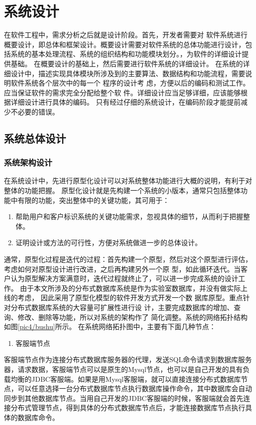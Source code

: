 
\chapter{系统设计}
在软件工程中，需求分析之后就是设计阶段。首先，开发者需要对
软件系统进行概要设计，即总体和框架设计。概要设计需要对软件系统的总体功能进行设计，包括系统的基本处理流程、系统的组织结构和功能模块划分。，为软件的详细设计提供基础。
在概要设计的基础上，然后需要进行软件系统的详细设计。
在系统的详细设计中，描述实现具体模块所涉及到的主要算法、数据结构和功能流程，需要说明软件系统各个层次中的每一个
程序的设计考
虑，方便以后的编码和测试工作。应当保证软件的需求完全分配给整个软
件。详细设计应当足够详细，应该能够根据详细设计进行具体的编码。
只有经过仔细的系统设计，在编码阶段才能提前减少不必要的错误。
\section{系统总体设计}
\subsection{系统架构设计}
在系统设计中，先进行原型化设计可以对系统整体功能进行大概的说明，有利于对整体的功能把握。
原型化设计就是先构建一个系统的小版本，通常只包括整体功能中有限的功能，突出整体中的关键功能，其可用于：
\begin{enumerate}
	\item 帮助用户和客户标识系统的关键功能需求，忽视具体的细节，从而利于把握整体。
	\item 证明设计或方法的可行性，方便对系统做进一步的总体设计。
\end{enumerate}
通常，原型化过程是迭代的过程：首先构建一个原型，然后对这个原型进行评估，考虑如何对原型设计进行改进，之后再构建另外一个原
型，如此循环迭代。当客户认为原型解决方案满意时，迭代过程就终止了，可以进一步完成系统的设计工作。
由于本文所涉及的分布式数据库系统是作为实验室数据库，并没有做实际上线的考虑，
因此采用了原型化模型的软件开发方式开发一个数
据库原型。重点针对分布式数据库系统的大容量可扩展性进行设
计，主要完成数据库的增加、查询、修改、删除等功能，所以对系统的架构作了
简化调整。系统的网络拓扑结构如图\ref{pic4/bushu}所示。
在系统网络拓扑图中，主要有下面几种节点：


	\begin{enumerate}
		\item 客服端节点
	\end{enumerate}

	客服端节点作为连接分布式数据库服务器的代理，发送SQL命令请求到数据库服务器，请求数据，客服端节点可以是原生的Mysql节点，也可以是自己开发的具有负载均衡的JDBC客服端。如果是用Mysql客服端，就可以直接连接分布式数据库节点，可以任意选择一台分布式数据库节点执行数据库操作命令，其中数据库会自动同步到其他数据库节点。当用自己开发的JDBC客服端的时候，客服端就会首先连接分布式管理节点，得到具体的分布式数据库节点后，才能连接数据库节点执行具体的数据库命令。

